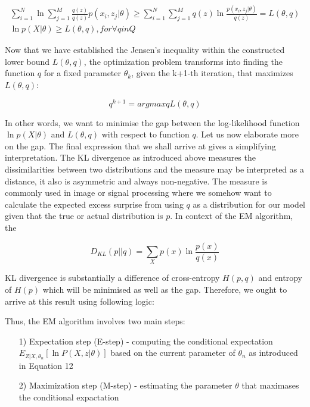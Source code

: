 \begin{gather}
\sum_{i=1}^{N} \ln \sum_{j=1}^{M} \frac{q(z)}{q(z)} p(x_i, z_j|\theta) \geq \sum_{i=1}^{N} \sum_{j=1}^{M} q(z) \ln \frac{p(x_i, z_j|\theta)}{q(z)} = L(\theta,q) \\
\ln p(X|\theta) \geq L(\theta,q), for \forall q in Q
\end{gather}

Now that we have established the Jensen's inequality within the constructed lower bound $L(\theta,q)$, the optimization problem transforms into finding the function $q$ for a fixed parameter $\theta_k$, given the k+1-th iteration, that maximizes $L(\theta, q)$:

\begin{equation}
q^{k+1} = arg max q L(\theta, q)
\end{equation}

In other words, we want to minimise the gap between the log-likelihood function $\ln p(X|\theta)$ and $L(\theta, q)$ with respect to function $q$. Let us now elaborate more on the gap. The final expression that we shall arrive at gives a simplifying interpretation. The KL divergence as introduced above measures the dissimilarities between two distributions and the measure may be interpreted as a distance, it also is asymmetric and always non-negative. The measure is commonly used in image or signal processing where we somehow want to calculate the expected excess surprise from using $q$ as a distribution for our model given that the true or actual distribution is $p$. In context of the EM algorithm, the

\begin{equation}
D_{KL} (p || q) = \sum_{X} p(x) \ln \frac{p(x)}{q(x)}
\end{equation}

KL divergence is substantially a difference of cross-entropy $H(p,q)$ and entropy of $H(p)$ which will be minimised as well as the gap. Therefore, we ought to arrive at this result using following logic:







Thus, the EM algorithm involves two main steps:

\begin{itemize}
\item[1)] Expectation step (E-step) - computing the conditional expectation $E_{Z|X,\theta_n} [\ln P(X,z|\theta)]$ based on the current parameter of $\theta_n$ as introduced in Equation 12
\item[2)] Maximization step (M-step) - estimating the parameter $\theta$ that maximases the conditional expactation
\end{itemize}

